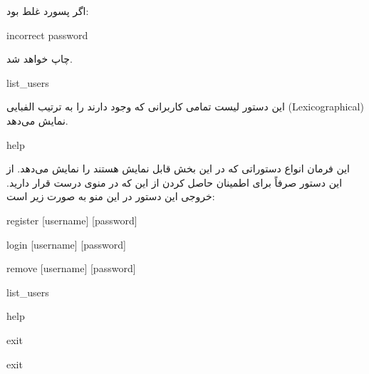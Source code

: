 \documentclass[]{article}
\begin{document}
اگر پسورد غلط بود:



\begin{tcolorbox}[boxrule=0pt]
	\begin{latin}
  	  \large{
  	  	incorrect password
		}
	\end{latin}
\end{tcolorbox}

چاپ خواهد شد.

\hrulefill




\begin{tcolorbox}[boxrule=0pt]
	\begin{latin}
  	  \large{
  	  	list\_users
		}
	\end{latin}
\end{tcolorbox}

این دستور لیست تمامی کاربرانی که وجود دارند را به ترتیب الفبایی (Lexicographical) نمایش می‌دهد.


\hrulefill



\begin{tcolorbox}[boxrule=0pt]
	\begin{latin}
  	  \large{
  	  	help
		}
	\end{latin}
\end{tcolorbox}

این فرمان انواع دستوراتی که در این بخش قابل نمایش هستند را نمایش می‌دهد. از این دستور صرفاً برای اطمینان حاصل کردن از این که در منوی درست قرار دارید. خروجی این دستور در این منو به صورت زیر است:



\begin{tcolorbox}[boxrule=0pt]
	\begin{latin}
  	  \large{
  	  	register [username] [password]
  	  	
login [username] [password]

remove [username] [password]

list\_users

help

exit
		}
	\end{latin}
\end{tcolorbox}

\hrulefill




\begin{tcolorbox}[boxrule=0pt]
	\begin{latin}
  	  \large{
  	  	exit
		}
	\end{latin}
\end{tcolorbox}
\end{document}
